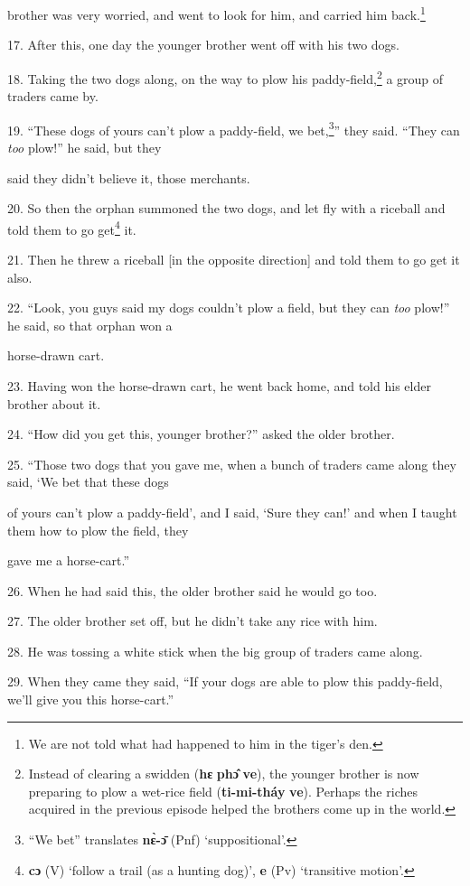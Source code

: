 brother was very worried, and went to look for him, and carried him back.\footnote{We are not told what had happened to him in the tiger's den.}

17. After this, one day the younger brother went off with his two dogs.

18. Taking the two dogs along, on the way to plow his paddy-field,\footnote{Instead of clearing a swidden (\textbf{hɛ} \textbf{phɔ̂} \textbf{ve}), the younger brother is now preparing to plow a wet-rice field (\textbf{ti-mi-tháy} \textbf{ve}). Perhaps the riches acquired in the previous episode helped the brothers come up in the world.} a group
of traders came by.

19. ``These dogs of yours can't plow a paddy-field, we bet,\footnote{``We bet'' translates \textbf{nɛ̀-ɔ̄} (Pnf) `suppositional'.}'' they said. ``They
can \textit{too} plow!'' he said, but they

said they didn't believe it, those merchants.

20. So then the orphan summoned the two dogs, and let fly with a riceball and told
them to go get\footnote{\textbf{cɔ} (V) `follow a trail (as a hunting dog)', \textbf{e} (Pv) `transitive motion'.} it.

21. Then he threw a riceball [in the opposite direction] and told them to go get
it also.

22. ``Look, you guys said my dogs couldn't plow a field, but they can \textit{too}
plow!'' he said, so that orphan won a

horse-drawn cart.

23. Having won the horse-drawn cart, he went back home, and told his elder brother
about it.

24. ``How did you get this, younger brother?'' asked the older brother.

25. ``Those two dogs that you gave me, when a bunch of traders came along they
said, `We bet that these dogs

of yours can't plow a paddy-field', and I said, `Sure they can!' and when I taught
them how to plow the field, they

gave me a horse-cart.''

26. When he had said this, the older brother said he would go too.

27. The older brother set off, but he didn't take any rice with him.

28. He was tossing a white stick when the big group of traders came along.

29. When they came they said, ``If your dogs are able to plow this paddy-field,
we'll give you this horse-cart.''

